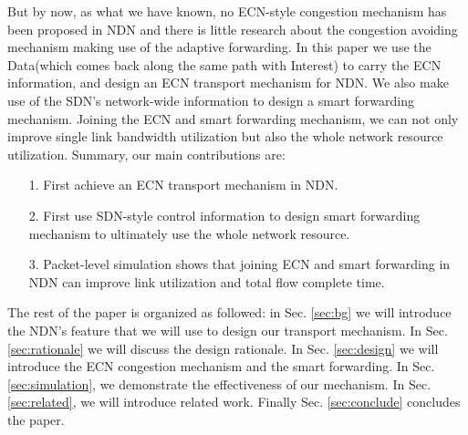 But by now, as what we have known, no ECN-style congestion mechanism has been proposed in NDN and there is little research about the congestion avoiding mechanism making use of the adaptive forwarding. In this paper we use the Data(which comes back along the same path with Interest) to carry the ECN information, and design an ECN transport mechanism for NDN. We also make use of the SDN's network-wide information to design a smart forwarding mechanism. Joining the ECN and smart forwarding mechanism, we can not only improve single link bandwidth utilization but also the whole network resource utilization. Summary, our main contributions are:

\begin{enumerate}
\item[1.] First achieve an ECN transport mechanism in NDN.
\item[2.] First use SDN-style control information to design smart forwarding mechanism to ultimately use the whole network resource.
\item[3.] Packet-level simulation shows that joining ECN and smart forwarding in NDN can improve link utilization and total flow complete time.
\end{enumerate}

The rest of the paper is organized as followed: in Sec. \ref{sec:bg} we will introduce the NDN's feature that we will use to design our transport mechanism. In Sec. \ref{sec:rationale} we will discuss the design rationale. In Sec. \ref{sec:design} we will introduce the ECN congestion mechanism and the smart forwarding. In Sec. \ref{sec:simulation}, we demonstrate the effectiveness of our mechanism. In Sec. \ref{sec:related}, we will introduce related work. Finally Sec. \ref{sec:conclude} concludes the paper.


